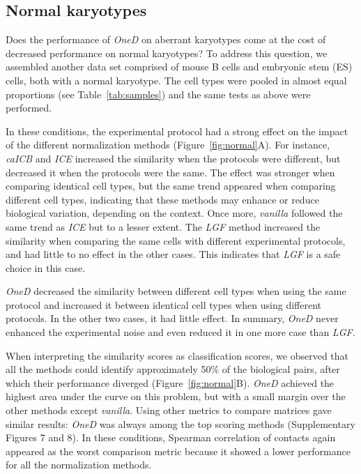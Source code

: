 \documentclass{article}
\begin{document}
\subsection{Normal karyotypes}

Does the performance of \textit{OneD} on aberrant karyotypes come at the
cost of decreased performance on normal karyotypes? To address this
question, we assembled another data set comprised of mouse B cells and
embryonic stem (ES) cells, both with a normal karyotype. The cell types
were pooled in almost equal proportions (see Table~\ref{tab:samples}) and
the same tests as above were performed.

In these conditions, the experimental protocol had a strong effect on the
impact of the different normalization methods (Figure~\ref{fig:normal}A).
For instance, \textit{caICB} and \textit{ICE} increased the similarity
when the protocols were different, but decreased it when the protocols
were the same. The effect was stronger when comparing identical cell
types, but the same trend appeared when comparing different cell types,
indicating that these methods may enhance or reduce biological variation,
depending on the context. Once more, \textit{vanilla} followed the same
trend as \textit{ICE} but to a lesser extent. The \textit{LGF} method
increased the similarity when comparing the same cells with different
experimental protocols, and had little to no effect in the other cases.
This indicates that \textit{LGF} is a safe choice in this case.

\textit{OneD} decreased the similarity between different cell types when
using the same protocol and increased it between identical cell types when
using different protocols. In the other two cases, it had little effect.
In summary, \textit{OneD} never enhanced the experimental noise and even
reduced it in one more case than \textit{LGF}.

When interpreting the similarity scores as classification scores, we
observed that all the methods could identify approximately 50\% of the
biological pairs, after which their performance diverged
(Figure~\ref{fig:normal}B). \textit{OneD} achieved the highest area under
the curve on this problem, but with a small margin over the other methods
except \textit{vanilla}. Using other metrics to compare matrices gave
similar results: \textit{OneD} was always among the top scoring methods
(Supplementary Figures 7 and 8). In these conditions, Spearman correlation
of contacts again appeared as the worst comparison metric because it
showed a lower performance for all the normalization methods.
\end{document}
